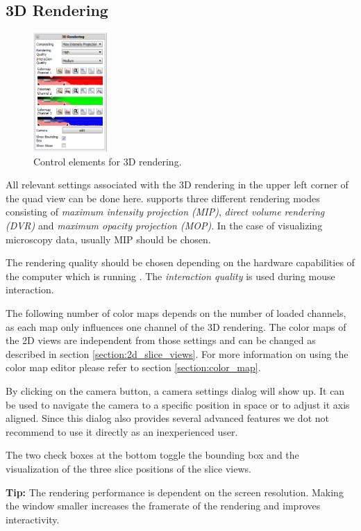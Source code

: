 \subsection{3D Rendering}\label{ultramicroscopy.section.3drendering}
\begin{minipage}{\textwidth}
\begin{figure}
\vspace*{-0cm}
\centering
\includegraphics[width=0.25\textwidth]{images/3d_rendering.png}
\caption{Control elements for 3D rendering.}
\label{ultramicroscopy.figure.3drendering}
\end{figure}
All relevant settings associated with the 3D rendering in the upper left corner of the quad view can be done here. \Voreen supports three different rendering modes consisting of 
\emph{maximum intensity projection (MIP)}, \emph{direct volume rendering (DVR)} and \emph{maximum opacity projection (MOP)}. In the case of visualizing microscopy data, usually MIP should be chosen.

The rendering quality should be chosen depending on the hardware capabilities of the computer which is running \Voreen. The \emph{interaction quality} is used during mouse interaction.

The following number of color maps depends on the number of loaded channels, as each map only influences one channel of the 3D rendering. 
The color maps of the 2D views are independent from those settings and can be changed as described in section \ref{section:2d_slice_views}. 
For more information on using the color map editor please refer to section \ref{section:color_map}.

By clicking on the camera button, a camera settings dialog will show up. It can be used to navigate the camera to a specific position in space or to adjust it axis aligned. 
Since this dialog also provides several advanced features we dot not recommend to use it directly as an inexperienced user.

The two check boxes at the bottom toggle the bounding box and the visualization of the three slice positions of the slice views.

\textbf{Tip: }The rendering performance is dependent on the screen resolution. Making the \Voreen window smaller increases the framerate of the rendering and improves interactivity.  
\end{minipage}


